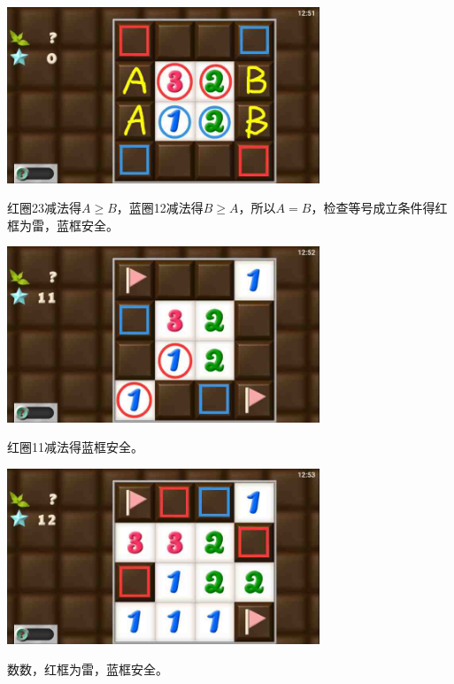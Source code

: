 \subsection{} %
\begin{center}
    \includegraphics[width=0.7\textwidth]{puzzlelow/137-1.jpg}
\end{center}
红圈23减法得$A\ge B$，蓝圈12减法得$B\ge A$，所以$A=B$，检查等号成立条件得红框为雷，蓝框安全。
\begin{center}
    \includegraphics[width=0.7\textwidth]{puzzlelow/137-2.jpg}
\end{center}
红圈11减法得蓝框安全。
\begin{center}
    \includegraphics[width=0.7\textwidth]{puzzlelow/137-3.jpg}
\end{center}
数数，红框为雷，蓝框安全。

